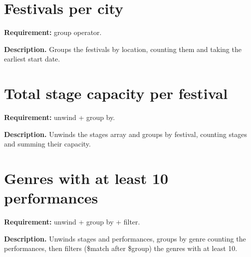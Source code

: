 

\section{Festivals per city}
\textbf{Requirement:} group operator.

\textbf{Description.} Groups the festivals by location, counting them and taking the earliest start date. 



\section{Total stage capacity per festival}
\textbf{Requirement:} unwind + group by.

\textbf{Description.} Unwinds the stages array and groups by festival, counting stages and summing their capacity. 



\section{Genres with at least 10 performances}
\textbf{Requirement:} unwind + group by + filter.

\textbf{Description.} Unwinds stages and performances, groups by genre counting the performances, then filters (\$match after \$group) the genres with at least 10. 



